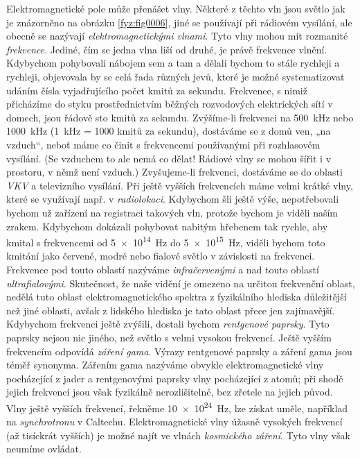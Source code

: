     Elektromagnetické pole může přenášet vlny. Některé z těchto vln jsou světlo jak je znázorněno na
    obrázku \ref{fyz:fig0006}, jiné se používají při rádiovém vysílání, ale obecně se nazývají
    \emph{elektromagnetickými vlnami}. Tyto vlny mohou mít rozmanité \emph{frekvence}. Jediné, čím
    se jedna vlna liší od druhé, je právě frekvence vlnění. Kdybychom pohybovali nábojem sem a tam a
    dělali bychom to stále rychleji a rychleji, objevovala by se celá řada různých jevů, které je
    možné systematizovat udáním čísla vyjadřujícího počet kmitů za sekundu. Frekvence, s nimiž
    přicházíme do styku prostřednictvím běžných rozvodových elektrických sítí v domech, jsou řádově
    sto kmitů za sekundu. Zvýšíme-li frekvenci na \SI{500}{\kHz} nebo \SI{1000}{\kHz} (\SI{1}{\kHz}
    = 1000 kmitů za sekundu), dostáváme se z domů ven, „na vzduch“, neboť máme co činit s
    frekvencemi používanými při rozhlasovém vysílání. (Se vzduchem to ale nemá co dělat! Rádiové
    vlny se mohou šířit i v prostoru, v němž není vzduch.) Zvyšujeme-li frekvenci, dostáváme se do
    oblasti \emph{VKV} a televizního vysílání. Při ještě vyšších frekvencích máme velmi krátké vlny,
    které se využívají např. v \emph{radiolokaci}. Kdybychom šli ještě výše, nepotřebovali bychom už
    zařízení na registraci takových vln, protože bychom je viděli naším zrakem. Kdybychom dokázali
    pohybovat nabitým hřebenem tak rychle, aby kmital s frekvencemi od \SI{5e14}{\Hz} do
    \SI{5e15}{\Hz}, viděli bychom toto kmitání jako červené, modré nebo fialové světlo v závislosti
    na frekvenci. Frekvence pod touto oblastí nazýváme \emph{infračervenými} a nad touto oblastí
    \emph{ultrafialovými}. Skutečnost, že naše vidění je omezeno na určitou frekvenční oblast,
    nedělá tuto oblast elektromagnetického spektra z fyzikálního hlediska důležitější než jiné
    oblasti, avšak z lidského hlediska je tato oblast přece jen zajímavější. Kdybychom frekvenci
    ještě zvýšili, dostali bychom \emph{rentgenové paprsky}. Tyto paprsky nejsou nic jiného, než
    světlo s velmi vysokou frekvencí. Ještě vyšším frekvencím odpovídá \emph{záření gama}. Výrazy
    rentgenové paprsky a záření gama jsou téměř synonyma. Zářením gama nazýváme obvykle
    elektromagnetické vlny pocházející z jader a rentgenovými paprsky vlny pocházející z atomů; při
    shodě jejich frekvencí jsou však fyzikálně nerozlišitelné, bez zřetele na jejich původ. Vlny
    ještě vyšších frekvencí, řekněme \SI{10e24}{\Hz}, lze získat uměle, například na
    \emph{synchrotronu} v Caltechu. Elektromagnetické vlny úžasně vysokých frekvencí (až tisíckrát
    vyšších) je možné najít ve vlnách \emph{kosmického záření}. Tyto vlny však neumíme ovládat. 
    \cite[s.~29]{Feynman02}

